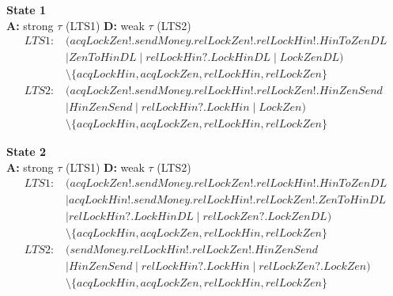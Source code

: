\documentclass{report}
\begin{document}
\begin{mdframed}
\textbf{State 1} \\
\textbf{A:} strong $\tau$ (LTS1) \quad \textbf{D:} weak $\tau$ (LTS2)
\begin{align*}
\textit{LTS1:}\; & (\mathit{acqLockZen!}.\mathit{sendMoney}.\mathit{relLockZen!}.\mathit{relLockHin!}.\mathit{HinToZenDL} \\
                 & \mid \mathit{ZenToHinDL} \mid \mathit{relLockHin?}.\mathit{LockHinDL} \mid \mathit{LockZenDL}) \\
                 & \setminus \{\mathit{acqLockHin}, \mathit{acqLockZen}, \mathit{relLockHin}, \mathit{relLockZen}\} \\[6pt]
\textit{LTS2:}\; & (\mathit{acqLockZen!}.\mathit{sendMoney}.\mathit{relLockHin!}.\mathit{relLockZen!}.\mathit{HinZenSend} \\
                 & \mid \mathit{HinZenSend} \mid \mathit{relLockHin?}.\mathit{LockHin} \mid \mathit{LockZen}) \\
                 & \setminus \{\mathit{acqLockHin}, \mathit{acqLockZen}, \mathit{relLockHin}, \mathit{relLockZen}\}
\end{align*}
\end{mdframed}

\begin{mdframed}
\textbf{State 2} \\
\textbf{A:} strong $\tau$ (LTS1) \quad \textbf{D:} weak $\tau$ (LTS2)
\begin{align*}
\textit{LTS1:}\; & (\mathit{acqLockZen!}.\mathit{sendMoney}.\mathit{relLockZen!}.\mathit{relLockHin!}.\mathit{HinToZenDL} \\
                 & \mid \mathit{acqLockHin!}.\mathit{sendMoney}.\mathit{relLockHin!}.\mathit{relLockZen!}.\mathit{ZenToHinDL} \\
                 & \mid \mathit{relLockHin?}.\mathit{LockHinDL} \mid \mathit{relLockZen?}.\mathit{LockZenDL}) \\
                 & \setminus \{\mathit{acqLockHin}, \mathit{acqLockZen}, \mathit{relLockHin}, \mathit{relLockZen}\} \\[6pt]
\textit{LTS2:}\; & (\mathit{sendMoney}.\mathit{relLockHin!}.\mathit{relLockZen!}.\mathit{HinZenSend} \\
                 & \mid \mathit{HinZenSend} \mid \mathit{relLockHin?}.\mathit{LockHin} \mid \mathit{relLockZen?}.\mathit{LockZen}) \\
                 & \setminus \{\mathit{acqLockHin}, \mathit{acqLockZen}, \mathit{relLockHin}, \mathit{relLockZen}\}
\end{align*}
\end{mdframed}
\end{document}
